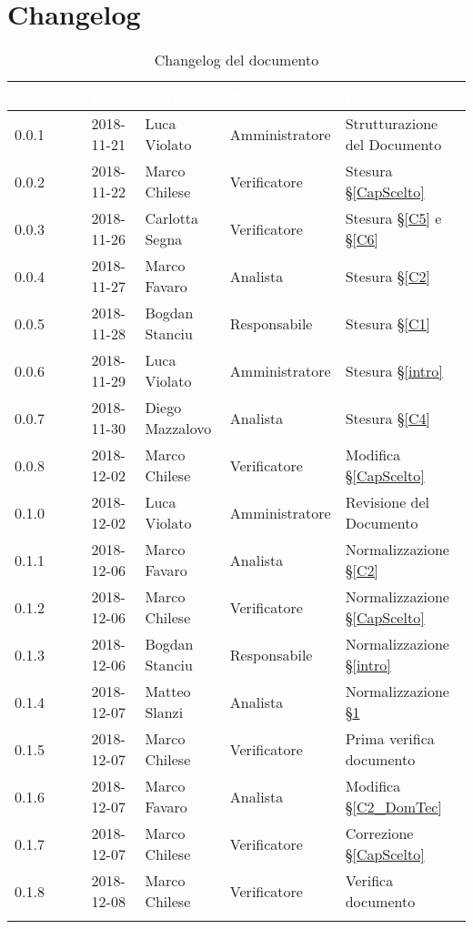 \section{Changelog}\label{changelog}

\begin{center}
\begin{longtable}[c]{|m{}|m{}|m{}|m{}|p{}|}
\hline
\rowcolor{bluelogo}\textbf{\textcolor{white}{Versione}} & \textbf{\textcolor{white}{Data}} & \textbf{\textcolor{white}{Autore}} & \textbf{\textcolor{white}{Ruolo}} & \textbf{\textcolor{white}{Descrizione}} \\
\hline \hline
\endfirsthead
0.0.1 & 2018-11-21 & Luca Violato & Amministratore & Strutturazione del Documento \\
\hline
\rowcolor{grigio}0.0.2 & 2018-11-22 & Marco Chilese & Verificatore & Stesura §\ref{CapScelto} \\
\hline
0.0.3 & 2018-11-26 & Carlotta Segna & Verificatore & Stesura §\ref{C5} e §\ref{C6} \\
\hline
\rowcolor{grigio}0.0.4 & 2018-11-27 & Marco Favaro & Analista & Stesura §\ref{C2} \\
\hline
0.0.5 & 2018-11-28 & Bogdan Stanciu & Responsabile & Stesura §\ref{C1}\\
\hline
\rowcolor{grigio}0.0.6 & 2018-11-29 & Luca Violato & Amministratore & Stesura §\ref{intro}\\
\hline
0.0.7 & 2018-11-30 & Diego Mazzalovo & Analista & Stesura §\ref{C4} \\
\hline
\rowcolor{grigio}0.0.8 & 2018-12-02 & Marco Chilese & Verificatore & Modifica §\ref{CapScelto} \\
\hline
0.1.0 & 2018-12-02 & Luca Violato & Amministratore & Revisione del Documento\\
\hline
\rowcolor{grigio}0.1.1 & 2018-12-06 & Marco Favaro & Analista & Normalizzazione §\ref{C2}\\
\hline
0.1.2 & 2018-12-06 & Marco Chilese & Verificatore & Normalizzazione §\ref{CapScelto}\\
\hline
\rowcolor{grigio}0.1.3 & 2018-12-06 & Bogdan Stanciu & Responsabile & Normalizzazione §\ref{intro}\\
\hline
0.1.4 & 2018-12-07 & Matteo Slanzi & Analista & Normalizzazione §\ref{changelog}\\
\hline
\rowcolor{grigio}0.1.5 & 2018-12-07 & Marco Chilese & Verificatore & Prima verifica documento\\
\hline
0.1.6 & 2018-12-07 & Marco Favaro & Analista & Modifica §\ref{C2_DomTec}\\
\hline
\rowcolor{grigio}0.1.7 & 2018-12-07 & Marco Chilese & Verificatore & Correzione §\ref{CapScelto}\\
\hline
0.1.8 & 2018-12-08 & Marco Chilese & Verificatore & Verifica documento\\
\hline
\caption{Changelog del documento}
\end{longtable}
\end{center}
